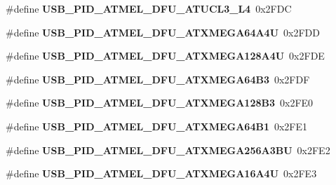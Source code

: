 \begin{DoxyCompactItemize}
\item 
\hypertarget{group__usb__atmel__ids__group_ga1900799a18ce9b26d16290c4728305ef}{\#define {\bfseries U\-S\-B\-\_\-\-P\-I\-D\-\_\-\-A\-T\-M\-E\-L\-\_\-\-D\-F\-U\-\_\-\-A\-T\-U\-C\-L3\-\_\-\-L4}~0x2\-F\-D\-C}\label{group__usb__atmel__ids__group_ga1900799a18ce9b26d16290c4728305ef}

\item 
\hypertarget{group__usb__atmel__ids__group_gaa29f6fb37c494858780615e56192d5a7}{\#define {\bfseries U\-S\-B\-\_\-\-P\-I\-D\-\_\-\-A\-T\-M\-E\-L\-\_\-\-D\-F\-U\-\_\-\-A\-T\-X\-M\-E\-G\-A64\-A4\-U}~0x2\-F\-D\-D}\label{group__usb__atmel__ids__group_gaa29f6fb37c494858780615e56192d5a7}

\item 
\hypertarget{group__usb__atmel__ids__group_ga42f45d78bd5b5ea5ddd9b03f506837c8}{\#define {\bfseries U\-S\-B\-\_\-\-P\-I\-D\-\_\-\-A\-T\-M\-E\-L\-\_\-\-D\-F\-U\-\_\-\-A\-T\-X\-M\-E\-G\-A128\-A4\-U}~0x2\-F\-D\-E}\label{group__usb__atmel__ids__group_ga42f45d78bd5b5ea5ddd9b03f506837c8}

\item 
\hypertarget{group__usb__atmel__ids__group_ga64c6e4975fdca50988e19b31be232bd1}{\#define {\bfseries U\-S\-B\-\_\-\-P\-I\-D\-\_\-\-A\-T\-M\-E\-L\-\_\-\-D\-F\-U\-\_\-\-A\-T\-X\-M\-E\-G\-A64\-B3}~0x2\-F\-D\-F}\label{group__usb__atmel__ids__group_ga64c6e4975fdca50988e19b31be232bd1}

\item 
\hypertarget{group__usb__atmel__ids__group_gaec02e6698096866137d24d10d6fbf736}{\#define {\bfseries U\-S\-B\-\_\-\-P\-I\-D\-\_\-\-A\-T\-M\-E\-L\-\_\-\-D\-F\-U\-\_\-\-A\-T\-X\-M\-E\-G\-A128\-B3}~0x2\-F\-E0}\label{group__usb__atmel__ids__group_gaec02e6698096866137d24d10d6fbf736}

\item 
\hypertarget{group__usb__atmel__ids__group_gae2e17c4706a960d29f0ad72ec40682b9}{\#define {\bfseries U\-S\-B\-\_\-\-P\-I\-D\-\_\-\-A\-T\-M\-E\-L\-\_\-\-D\-F\-U\-\_\-\-A\-T\-X\-M\-E\-G\-A64\-B1}~0x2\-F\-E1}\label{group__usb__atmel__ids__group_gae2e17c4706a960d29f0ad72ec40682b9}

\item 
\hypertarget{group__usb__atmel__ids__group_gafe3023d87ca060c2f83a92b2e7f285c7}{\#define {\bfseries U\-S\-B\-\_\-\-P\-I\-D\-\_\-\-A\-T\-M\-E\-L\-\_\-\-D\-F\-U\-\_\-\-A\-T\-X\-M\-E\-G\-A256\-A3\-B\-U}~0x2\-F\-E2}\label{group__usb__atmel__ids__group_gafe3023d87ca060c2f83a92b2e7f285c7}

\item 
\hypertarget{group__usb__atmel__ids__group_ga74c85652a9b3561d5e4282a84224bd9d}{\#define {\bfseries U\-S\-B\-\_\-\-P\-I\-D\-\_\-\-A\-T\-M\-E\-L\-\_\-\-D\-F\-U\-\_\-\-A\-T\-X\-M\-E\-G\-A16\-A4\-U}~0x2\-F\-E3}\label{group__usb__atmel__ids__group_ga74c85652a9b3561d5e4282a84224bd9d}


\end{DoxyCompactItemize}
